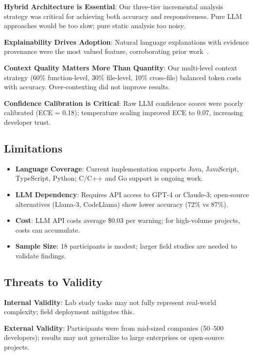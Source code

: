 \documentclass[conference]{IEEEtran}
\begin{document}
\textbf{Hybrid Architecture is Essential}: Our three-tier incremental analysis strategy was critical for achieving both accuracy and responsiveness. Pure LLM approaches would be too slow; pure static analysis too noisy.

\textbf{Explainability Drives Adoption}: Natural language explanations with evidence provenance were the most valued feature, corroborating prior work~\cite{kang2024explainable, yan2024better}.

\textbf{Context Quality Matters More Than Quantity}: Our multi-level context strategy (60\% function-level, 30\% file-level, 10\% cross-file) balanced token costs with accuracy. Over-contexting did not improve results.

\textbf{Confidence Calibration is Critical}: Raw LLM confidence scores were poorly calibrated (ECE = 0.18); temperature scaling improved ECE to 0.07, increasing developer trust.

\subsection{Limitations}

\begin{itemize}
\item \textbf{Language Coverage}: Current implementation supports Java, JavaScript, TypeScript, Python; C/C++ and Go support is ongoing work.
\item \textbf{LLM Dependency}: Requires API access to GPT-4 or Claude-3; open-source alternatives (Llama-3, CodeLlama) show lower accuracy (72\% vs 87\%).
\item \textbf{Cost}: LLM API costs average \$0.03 per warning; for high-volume projects, costs can accumulate.
\item \textbf{Sample Size}: 18 participants is modest; larger field studies are needed to validate findings.
\end{itemize}

\subsection{Threats to Validity}

\textbf{Internal Validity}: Lab study tasks may not fully represent real-world complexity; field deployment mitigates this.

\textbf{External Validity}: Participants were from mid-sized companies (50--500 developers); results may not generalize to large enterprises or open-source projects.
\end{document}
